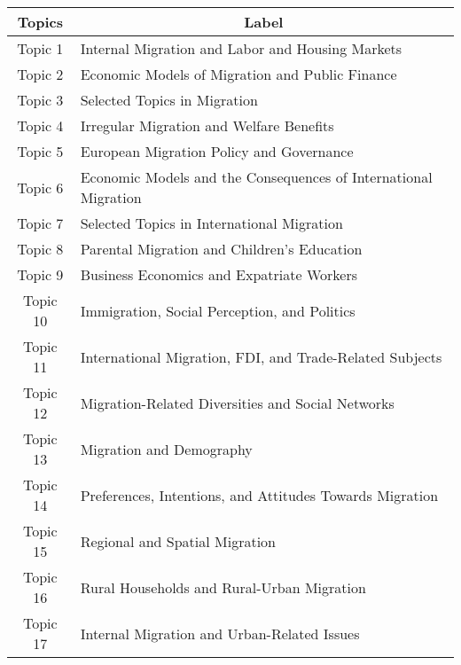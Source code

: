 \begin{landscape}

\end{landscape}

\begin{landscape}

\end{landscape}

\begin{table}[]
\centering
\begin{tabular}{@{}cl@{}}
\toprule
\textbf{Topics} & \multicolumn{1}{c}{\textbf{Label}}                                          \\ \midrule
Topic 1         & Internal Migration and Labor and Housing Markets         \\
Topic 2         & Economic Models of Migration and Public Finance          \\
Topic 3         & Selected Topics in Migration                             \\
Topic 4         & Irregular Migration and Welfare Benefits                 \\
Topic 5         & European Migration Policy and Governance                 \\
Topic 6         & Economic Models and the Consequences of International Migration           \\
Topic 7         & Selected Topics in International Migration               \\
Topic 8         & Parental Migration and Children's Education              \\
Topic 9         & Business Economics and Expatriate Workers                \\
Topic 10        & Immigration, Social Perception, and Politics             \\
Topic 11        & International Migration, FDI, and Trade-Related Subjects \\
Topic 12        & Migration-Related Diversities and Social Networks        \\
Topic 13        & Migration and Demography                                 \\
Topic 14        & Preferences, Intentions, and Attitudes Towards Migration \\
Topic 15        & Regional and Spatial Migration                           \\
Topic 16        & Rural Households and Rural-Urban Migration               \\
Topic 17        & Internal Migration and Urban-Related Issues              \\

\end{tabular}
\end{table}
